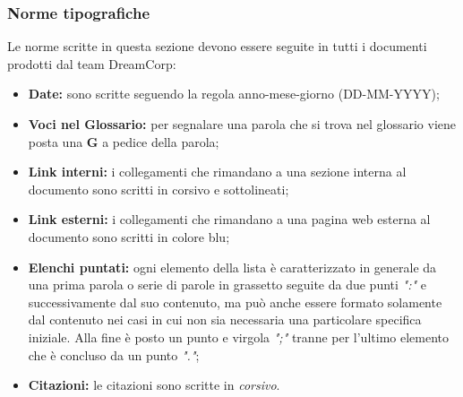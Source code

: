 		\subsubsection{Norme tipografiche}
			Le norme scritte in questa sezione devono essere seguite in tutti i documenti prodotti dal team DreamCorp:
			\begin{itemize}
				\item \textbf{Date:} sono scritte seguendo la regola anno-mese-giorno (DD-MM-YYYY);
				\item \textbf{Voci nel Glossario:} per segnalare una parola che si trova nel glossario viene posta una \textbf{G} a pedice della parola;
				\item \textbf{Link interni:} i collegamenti che rimandano a una sezione interna al documento sono scritti in corsivo e sottolineati;
				\item \textbf{Link esterni:} i collegamenti che rimandano a una pagina web esterna al documento sono scritti in colore blu;
				\item \textbf{Elenchi puntati:} ogni elemento della lista è caratterizzato in generale da una prima parola o serie di parole in grassetto seguite da due punti \textit{":"} e successivamente dal suo contenuto, ma può anche essere formato solamente dal contenuto nei casi in cui non sia necessaria una particolare specifica iniziale. Alla fine è posto un punto e virgola \textit{";"} tranne per l'ultimo elemento che è concluso da un punto \textit{"."};
				\item \textbf{Citazioni:} le citazioni sono scritte in \textit{corsivo}.
			\end{itemize}
